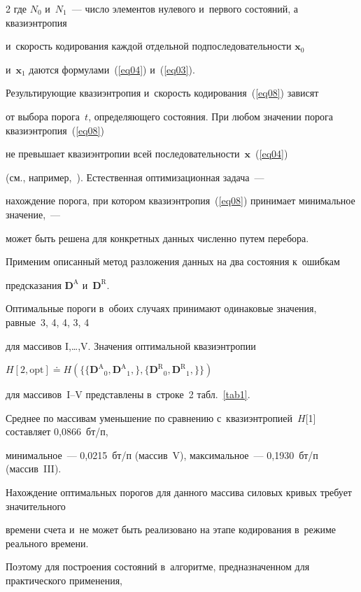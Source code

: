 \begin{multicols}{2}
где $N_0$ и~$N_1$~--- число элементов нулевого и~первого состояний, а квазиэнтропия

 и~ско\-рость кодирования каждой отдельной подпоследовательности $\mathbf{x}_0$ 

и~$\mathbf{x}_1$ даются формулами~(\ref{eq04}) и~(\ref{eq03}).



Результирующие квазиэнтропия и~скорость кодирования~(\ref{eq08}) зависят 

от выбора порога~$t$, определяющего состояния. При любом значении порога квазиэнтропия~(\ref{eq08}) 

не превышает квазиэнтропии всей последовательности~$\mathbf{x}$~(\ref{eq04}) 

(см., например,~\cite{b4}). Естественная оптимизационная задача~--- 

нахождение порога, при котором квазиэнтропия~(\ref{eq08}) принимает минимальное значение,~--- 

может быть решена для конкретных данных численно путем перебора.



Применим описанный метод разложения данных на два состояния к~ошибкам 

предсказания   $\mathbf{D}^\text{A}$ и~$\mathbf{D}^\text{R}$. 

Оптимальные пороги в~обоих случаях принимают одинаковые значения, равные~3, 4, 4, 3, 4 

для массивов I,\dots,V. Значения оптимальной квазиэнтропии

$H[2,\text{opt}] \doteq H(\{ 

\{{\mathbf{D}^\text{A} }_0,{\mathbf{D}^\text{A} }_1,\},

\{{\mathbf{D}^\text{R} }_0,{\mathbf{D}^\text{R} }_1,\}

\})$

для массивов~I--V представлены в~строке~2 табл.~\ref{tab1}. 

Среднее по массивам уменьшение по сравнению с~квазиэнтропией~$H$[1] составляет 0,0866~бт/п, 

минимальное~--- 0,0215~бт/п (массив~V), максимальное~--- 0,1930~бт/п (массив~III).



Нахождение оптимальных порогов для данного массива силовых кривых требует значительного 

времени счета и~не может быть реализовано на этапе кодирования в~режиме реального времени. 

Поэтому для построения состояний в~алгоритме, предназначенном для практического применения, 


\end{multicols}
